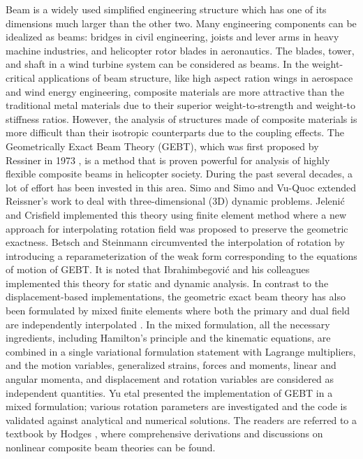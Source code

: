 \documentclass{aiaa-tc}
\begin{document}
Beam is a widely used simplified engineering structure which has one of its dimensions much larger than the other two. Many engineering components can be idealized as beams: bridges in civil engineering, joists and lever arms in heavy machine industries, and helicopter rotor blades in aeronautics. The blades, tower, and shaft in a wind turbine system can be considered as beams. In the weight-critical applications of beam structure, like high aspect ration wings in aerospace and wind energy engineering, composite materials are more attractive than the traditional metal materials due to their superior weight-to-strength and weight-to stiffness ratios. However, the analysis of structures made of composite materials is more difficult than their isotropic counterparts due to the coupling effects. The Geometrically Exact Beam Theory (GEBT), which was first proposed by Ressiner in 1973 \cite{Ressiner1973}, is a method that is proven powerful for analysis of highly flexible composite beams in helicopter society. During the past several decades, a lot of effort has been invested in this area. Simo \cite{Simo1985} and Simo and Vu-Quoc \cite{Simo1986} extended Reissner's work to deal with three-dimensional (3D) dynamic problems. Jeleni\'c and Crisfield \cite{Crisfield1999} implemented this theory using finite element method where a new approach for interpolating rotation field was proposed to preserve the geometric exactness. Betsch and Steinmann \cite{Betsch2002} circumvented the interpolation of rotation by introducing a reparameterization of the weak form corresponding to the equations of motion of GEBT. It is noted that Ibrahimbegovi\'c and his colleagues implemented this theory for static \cite{Ibrahim1995} and dynamic \cite{Ibrahim1998} analysis. In contrast to the displacement-based implementations, the geometric exact beam theory has also
been formulated by mixed finite elements where both the primary and dual field are independently interpolated \cite{CookFEM}. In the mixed
formulation, all the necessary ingredients, including Hamilton's principle and the kinematic equations, are combined in a single variational
formulation statement with Lagrange multipliers, and the motion variables, generalized strains, forces and moments, linear and angular momenta, and displacement and rotation variables are considered as independent quantities. Yu etal \cite{YuGEBT} presented the implementation of GEBT in a mixed formulation; various rotation parameters are investigated and the code is validated against analytical and numerical solutions. The readers are referred to a textbook by Hodges \cite{HodgesBeamBook}, where comprehensive derivations and discussions on nonlinear composite beam theories can be found.
\end{document}
